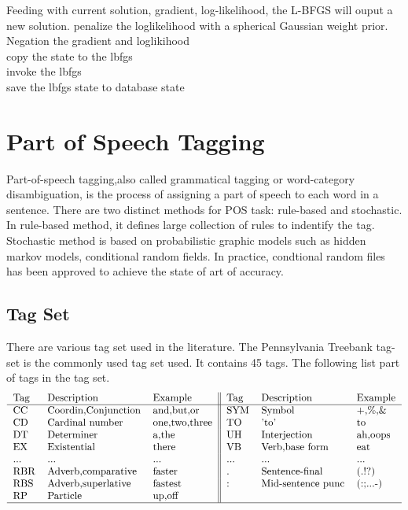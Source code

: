 Feeding with current solution, gradient, log-likelihood, the L-BFGS will ouput a new solution.
penalize the loglikelihood with a spherical Gaussian weight prior.\\
Negation the gradient and loglikihood\\
copy the state to the lbfgs\\
invoke the lbfgs\\
save the lbfgs state to database state\\

\section{Part of Speech Tagging}
Part-of-speech tagging,also called grammatical tagging or word-category disambiguation, is the process of assigning 
a part of speech to each word in a sentence. There are two distinct methods for POS task: rule-based and stochastic.
In rule-based method, it defines large collection of rules to indentify the tag. Stochastic method is based on probabilistic 
graphic models such as hidden markov models, conditional random fields. In practice, condtional random files has been approved 
to achieve the state of art of accuracy.
\subsection{Tag Set}
There are various tag set used in the literature. The Pennsylvania Treebank tag-set is the commonly used tag set used. It contains
45 tags. The following list part of tags in the tag set.
\[\begin{tabular}{lll||lll}
  Tag & Description         & Example       & Tag & Description         & Example\\
  \hline                        
  CC  & Coordin,Conjunction & and,but,or    & SYM & Symbol              & +,\%,\&\\
  CD  & Cardinal number     & one,two,three & TO  & 'to'                & to\\
  DT  & Determiner          & a,the         & UH  & Interjection        & ah,oops\\
  EX  & Existential         & there         & VB  & Verb,base form      & eat\\
  ... & ...                 & ...           & ... & ...                 & ...\\
  RBR & Adverb,comparative  & faster        & .   & Sentence-final      & (.!?)\\
  RBS & Adverb,superlative  & fastest       & :   & Mid-sentence punc   & (:;...-)\\
  RP  & Particle            & up,off        &     &                     &\\
  \hline  
\end{tabular}\]

